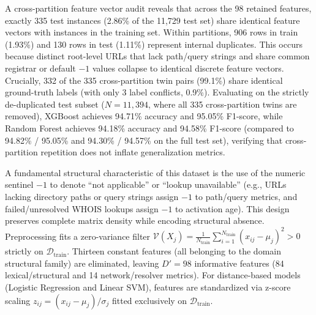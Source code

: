 A cross-partition feature vector audit reveals that across the 98 retained features, exactly 335 test instances (2.86\% of the 11,729 test set) share identical feature vectors with instances in the training set. Within partitions, 906 rows in train (1.93\%) and 130 rows in test (1.11\%) represent internal duplicates. This occurs because distinct root-level URLs that lack path/query strings and share common registrar or default $-1$ values collapse to identical discrete feature vectors. Crucially, 332 of the 335 cross-partition twin pairs (99.1\%) share identical ground-truth labels (with only 3 label conflicts, 0.9\%). Evaluating on the strictly de-duplicated test subset ($N = 11,394$, where all 335 cross-partition twins are removed), XGBoost achieves 94.71\% accuracy and 95.05\% F1-score, while Random Forest achieves 94.18\% accuracy and 94.58\% F1-score (compared to 94.82\% / 95.05\% and 94.30\% / 94.57\% on the full test set), verifying that cross-partition repetition does not inflate generalization metrics.

A fundamental structural characteristic of this dataset is the use of the numeric sentinel $-1$ to denote ``not applicable'' or ``lookup unavailable'' (e.g., URLs lacking directory paths or query strings assign $-1$ to path/query metrics, and failed/unresolved WHOIS lookups assign $-1$ to activation age). This design preserves complete matrix density while encoding structural absence. Preprocessing fits a zero-variance filter $\mathcal{V}(X_j) = \frac{1}{N_{\text{train}}} \sum_{i=1}^{N_{\text{train}}} (x_{ij} - \mu_j)^2 > 0$ strictly on $\mathcal{D}_{\text{train}}$. Thirteen constant features (all belonging to the domain structural family) are eliminated, leaving $D' = 98$ informative features (84 lexical/structural and 14 network/resolver metrics). For distance-based models (Logistic Regression and Linear SVM), features are standardized via z-score scaling $z_{ij} = (x_{ij} - \mu_j)/\sigma_j$ fitted exclusively on $\mathcal{D}_{\text{train}}$.

